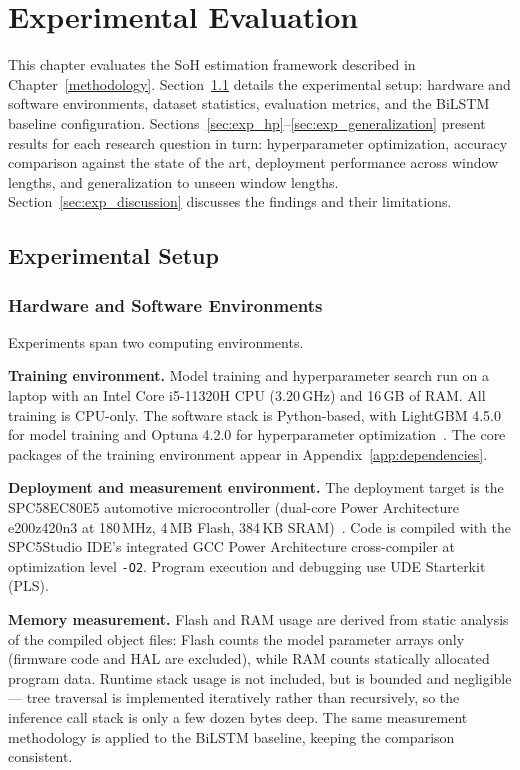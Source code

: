 \chapter{Experimental Evaluation}
\label{experiment}


This chapter evaluates the SoH estimation framework described in Chapter~\ref{methodology}. Section~\ref{sec:exp_setup} details the experimental setup: hardware and software environments, dataset statistics, evaluation metrics, and the BiLSTM baseline configuration. Sections~\ref{sec:exp_hp}--\ref{sec:exp_generalization} present results for each research question in turn: hyperparameter optimization, accuracy comparison against the state of the art, deployment performance across window lengths, and generalization to unseen window lengths. Section~\ref{sec:exp_discussion} discusses the findings and their limitations.


\section{Experimental Setup}
\label{sec:exp_setup}

\subsection{Hardware and Software Environments}

Experiments span two computing environments.

\textbf{Training environment.} Model training and hyperparameter search run on a laptop with an Intel Core i5-11320H CPU (3.20\,GHz) and 16\,GB of RAM. All training is CPU-only. The software stack is Python-based, with LightGBM 4.5.0 for model training and Optuna 4.2.0 for hyperparameter optimization~\autocite{ke2017,akiba2019}. The core packages of the training environment appear in Appendix~\ref{app:dependencies}.

\textbf{Deployment and measurement environment.} The deployment target is the SPC58EC80E5 automotive microcontroller (dual-core Power Architecture e200z420n3 at 180\,MHz, 4\,MB Flash, 384\,KB SRAM)~\autocite{spc58ec80e5_ds}. Code is compiled with the SPC5Studio IDE's integrated GCC Power Architecture cross-compiler at optimization level \texttt{-O2}. Program execution and debugging use UDE Starterkit (PLS).

\textbf{Memory measurement.} Flash and RAM usage are derived from static analysis of the compiled object files: Flash counts the model parameter arrays only (firmware code and HAL are excluded), while RAM counts statically allocated program data. Runtime stack usage is not included, but is bounded and negligible --- tree traversal is implemented iteratively rather than recursively, so the inference call stack is only a few dozen bytes deep. The same measurement methodology is applied to the BiLSTM baseline, keeping the comparison consistent.

